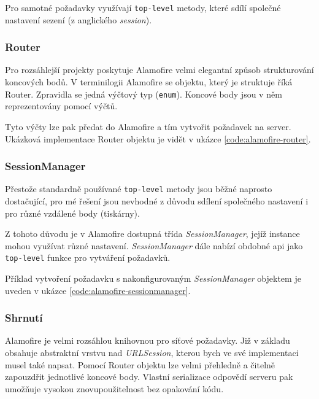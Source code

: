 Pro samotné požadavky využívají \texttt{top-level} metody, které sdílí společné nastavení sezení (z anglického \textit{session}).

\subsubsection*{Router}

Pro rozsáhlejší projekty poskytuje Alamofire velmi elegantní způsob strukturování koncových bodů.
V terminilogii Alamofire se objektu, který je struktuje říká Router.
Zpravidla se jedná výčtový typ (\texttt{enum}).
Koncové body jsou v něm reprezentovány pomocí výčtů.

Tyto výčty lze pak předat do Alamofire a tím vytvořit požadavek na server.
Ukázková implementace Router objektu je vidět v ukázce \ref{code:alamofire-router}.


\subsubsection*{SessionManager}

Přestože standardně používané \texttt{top-level} metody jsou běžné naprosto dostačující, pro mé řešení jsou nevhodné z důvodu sdílení společného nastavení i pro různé vzdálené body (tiskárny).

Z tohoto důvodu je v Alamofire dostupná třída \textit{SessionManager}, jejíž instance mohou využívat různé nastavení.
\textit{SessionManager} dále nabízí obdobné \acrshort{api} jako \texttt{top-level} funkce pro vytváření požadavků.

Příklad vytvoření požadavku s nakonfigurovaným \textit{SessionManager} objektem je uveden v ukázce \ref{code:alamofire-sessionmanager}.


\subsubsection*{Shrnutí}

Alamofire je velmi rozsáhlou knihovnou pro síťové požadavky.
Již v základu obsahuje abstraktní vrstvu nad \textit{URLSession}, kterou bych ve své implementaci musel také napsat.
Pomocí Router objektu lze velmi přehledně a čitelně zapouzdřit jednotlivé koncové body.
Vlastní serializace odpovědí serveru pak umožňuje vysokou znovupoužitelnost bez opakování kódu.

